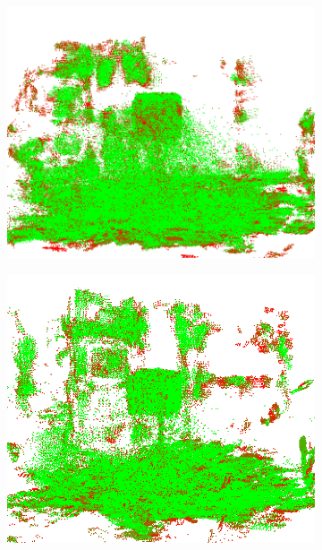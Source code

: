 \begin{figure}[h!tp]
    \centering
    \begin{subfigure}[b]{0.4\textwidth}
        \centering
        \includegraphics[width=0.9\linewidth]{images/eval-clouds-quant2}
    \end{subfigure}%
    \begin{subfigure}[b]{0.4\textwidth}
        \centering
        \includegraphics[width=0.9\linewidth]{images/eval-clouds-epsilon}
    \end{subfigure}%


\end{figure}
